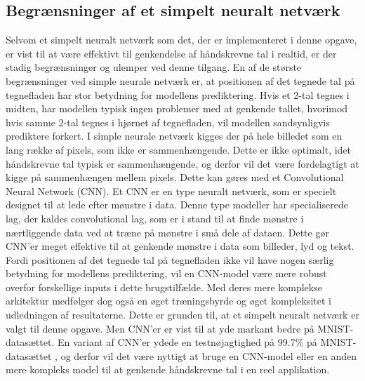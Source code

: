 \documentclass{article}
\begin{document}
\subsection{Begrænsninger af et simpelt neuralt netværk}
Selvom et simpelt neuralt netværk som det, der er implementeret i denne opgave, er vist til at være effektivt til genkendelse af håndskrevne tal i realtid, er der stadig begrænsninger og ulemper ved denne tilgang. En af de største begrænsninger ved simple neurale netværk er, at positionen af det tegnede tal på tegnefladen har stor betydning for modellens prediktering. Hvis et 2-tal tegnes i midten, har modellen typisk ingen problemer med at genkende tallet, hvorimod hvis samme 2-tal tegnes i hjørnet af tegnefladen, vil modellen sandsynligvis prediktere forkert. I simple neurale netværk kigges der på hele billedet som en lang række af pixels, som ikke er sammenhængende. Dette er ikke optimalt, idet håndskrevne tal typisk er sammenhængende, og derfor vil det være fordelagtigt at kigge på sammenhængen mellem pixels. Dette kan gøres med et Convolutional Neural Network (CNN). Et CNN er en type neuralt netværk, som er specielt designet til at lede efter mønstre i data. Denne type modeller har specialiserede lag, der kaldes convolutional lag, som er i stand til at finde mønstre i nærtliggende data ved at træne på mønstre i små dele af dataen. Dette gør CNN'er meget effektive til at genkende mønstre i data som billeder, lyd og tekst. Fordi positionen af det tegnede tal på tegnefladen ikke vil have nogen særlig betydning for modellens prediktering, vil en CNN-model være mere robust overfor forskellige inputs i dette brugstilfælde. Med deres mere komplekse arkitektur medfølger dog også en øget træningsbyrde og øget kompleksitet i udledningen af resultaterne. Dette er grunden til, at et simpelt neuralt netværk er valgt til denne opgave. Men CNN'er er vist til at yde markant bedre på MNIST-datasættet. En variant af CNN'er ydede en testnøjagtighed på 99.7\% på MNIST-datasættet \parencite{LeCun_1994}, og derfor vil det være nyttigt at bruge en CNN-model eller en anden mere kompleks model til at genkende håndskrevne tal i en reel applikation.

\newpage
\end{document}
